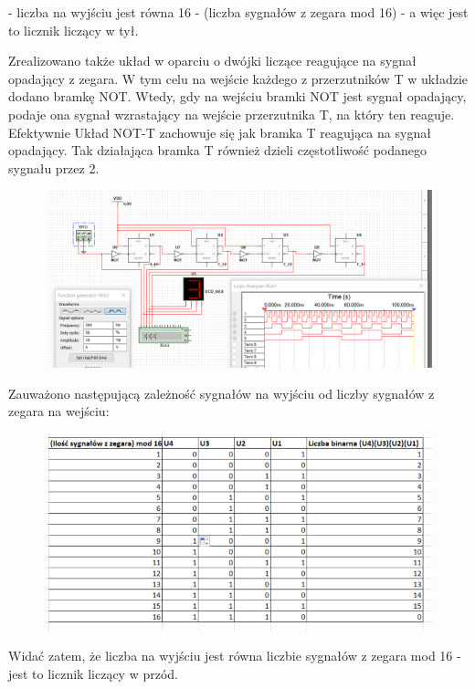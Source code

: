 \documentclass[12pt,a4paper]{article}
\begin{document}
- liczba na wyjściu jest równa 16 - (liczba sygnałów z zegara mod 16) - a więc jest to licznik liczący w tył.
\par
\par 
Zrealizowano także układ w oparciu o dwójki liczące reagujące na sygnał opadający z zegara. W tym celu na wejście każdego z przerzutników T w układzie dodano bramkę NOT. 
Wtedy, gdy na wejściu bramki NOT jest sygnał opadający, podaje ona sygnał wzrastający na wejście przerzutnika T, na który ten reaguje. Efektywnie Układ NOT-T zachowuje się jak bramka T reagująca na sygnał opadający. Tak działająca bramka T również dzieli częstotliwość podanego sygnału przez 2.


\begin{figure}[H]
\centering
\includegraphics[width=\textwidth]{img/4b_opad}
\end{figure}

Zauważono następującą zależność sygnałów na wyjściu od liczby sygnałów z zegara na wejściu:
\begin{figure}[H]
\centering
\includegraphics[width=\textwidth]{img/4b_opad_table}
\end{figure}

Widać zatem, że liczba na wyjściu jest równa liczbie sygnałów z zegara mod 16 - jest to licznik liczący w przód.
\end{document}

